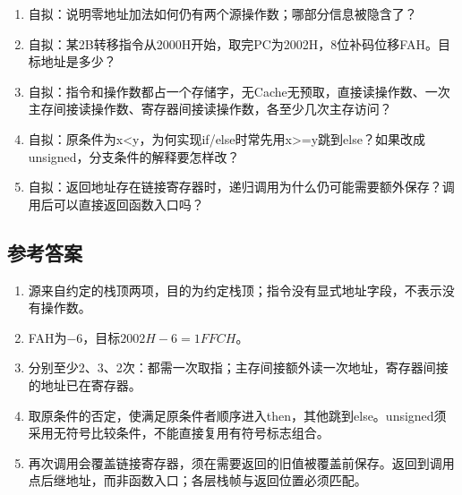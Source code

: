 \begin{recallcard}[主动回忆·自拟]

\begin{enumerate}
\def\labelenumi{\arabic{enumi}.}
\setcounter{enumi}{1}
\tightlist
\item
  自拟：说明零地址加法如何仍有两个源操作数；哪部分信息被隐含了？
\item
  自拟：某2B转移指令从2000H开始，取完PC为2002H，8位补码位移FAH。目标地址是多少？
\item
  自拟：指令和操作数都占一个存储字，无Cache无预取，直接读操作数、一次主存间接读操作数、寄存器间接读操作数，各至少几次主存访问？
\item
  自拟：原条件为x\textless y，为何实现if/else时常先用x\textgreater=y跳到else？如果改成unsigned，分支条件的解释要怎样改？
\item
  自拟：返回地址存在链接寄存器时，递归调用为什么仍可能需要额外保存？调用后可以直接返回函数入口吗？
\end{enumerate}

\end{recallcard}

\subsection{参考答案}\label{CO04-answers}

\begin{enumerate}
\def\labelenumi{\arabic{enumi}.}
\setcounter{enumi}{1}
\tightlist
\item
  源来自约定的栈顶两项，目的为约定栈顶；指令没有显式地址字段，不表示没有操作数。
\item
  FAH为\ensuremath{-}6，目标\(2002H-6=1FFCH\)。
\item
  分别至少2、3、2次：都需一次取指；主存间接额外读一次地址，寄存器间接的地址已在寄存器。
\item
  取原条件的否定，使满足原条件者顺序进入then，其他跳到else。unsigned须采用无符号比较条件，不能直接复用有符号标志组合。
\item
  再次调用会覆盖链接寄存器，须在需要返回的旧值被覆盖前保存。返回到调用点后继地址，而非函数入口；各层栈帧与返回位置必须匹配。
\end{enumerate}
